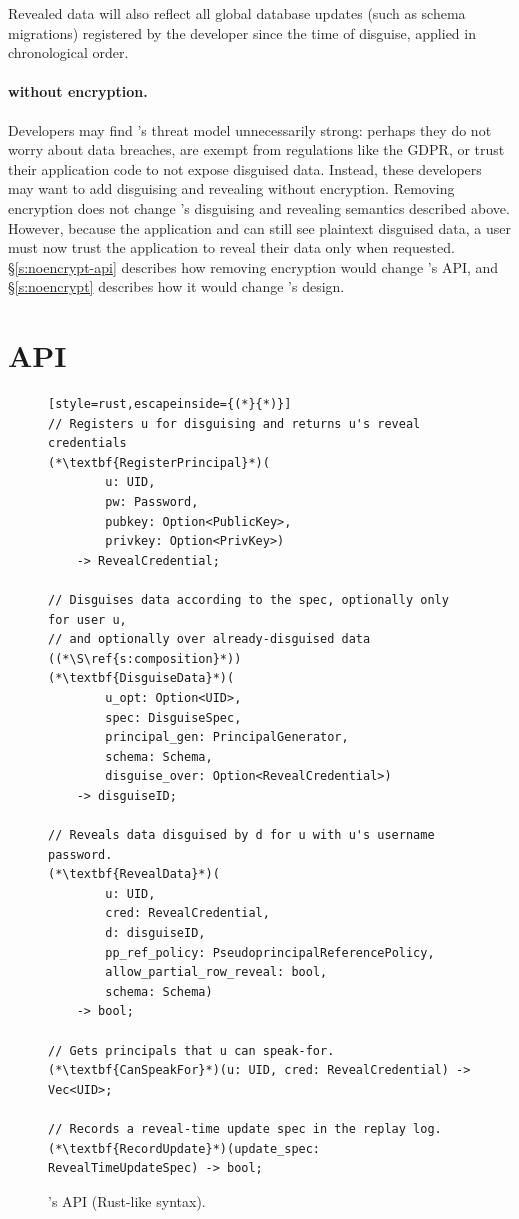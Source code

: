 Revealed data will also reflect all global database updates (such as schema
migrations) registered by the developer since the time of disguise, applied in
chronological order.


\paragraph{\sys without encryption.}
\label{s:semantics:noencrypt}

Developers may find \sys's threat model unnecessarily strong: perhaps they do
not worry about data breaches, are exempt from regulations like the GDPR, or
trust their application code to not expose disguised data. Instead, these
developers may want to add disguising and revealing without encryption.
%
Removing encryption does not change \sys's disguising and revealing semantics
described above.
However, because the application and \sys can still see plaintext disguised
data, a user must now trust the application to reveal their data only when 
requested. 
%
\S\ref{s:noencrypt-api} describes how removing encryption would change \sys's
API, and \S\ref{s:noencrypt} describes how it would change
\sys's design.


\section{API}
\label{s:api}

\begin{figure}[t]
\begin{lstlisting}[style=rust,escapeinside={(*}{*)}]
// Registers u for disguising and returns u's reveal credentials 
(*\textbf{RegisterPrincipal}*)(
        u: UID, 
        pw: Password,
        pubkey: Option<PublicKey>, 
        privkey: Option<PrivKey>)
    -> RevealCredential;

// Disguises data according to the spec, optionally only for user u, 
// and optionally over already-disguised data ((*\S\ref{s:composition}*))
(*\textbf{DisguiseData}*)(
        u_opt: Option<UID>, 
        spec: DisguiseSpec,
        principal_gen: PrincipalGenerator,
        schema: Schema,
        disguise_over: Option<RevealCredential>) 
    -> disguiseID;

// Reveals data disguised by d for u with u's username password. 
(*\textbf{RevealData}*)(
        u: UID, 
        cred: RevealCredential,
        d: disguiseID, 
        pp_ref_policy: PseudoprincipalReferencePolicy,
        allow_partial_row_reveal: bool,
        schema: Schema)
    -> bool;

// Gets principals that u can speak-for.
(*\textbf{CanSpeakFor}*)(u: UID, cred: RevealCredential) -> Vec<UID>;

// Records a reveal-time update spec in the replay log.
(*\textbf{RecordUpdate}*)(update_spec: RevealTimeUpdateSpec) -> bool;
\end{lstlisting}
\caption{\sys's API (Rust-like syntax).}
\label{f:api-high}
\end{figure}
%

